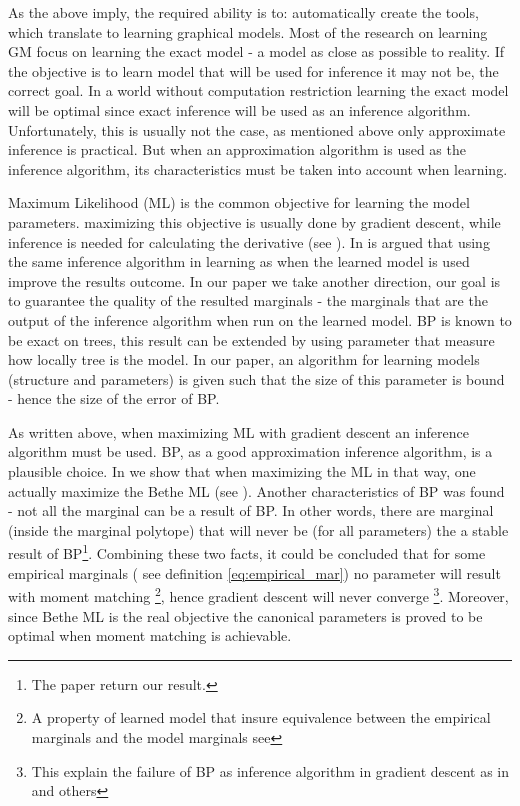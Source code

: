 As the above imply, the required ability is to: automatically create the tools, which translate to learning graphical models.
Most of the research on learning GM focus on learning the exact model - a model as close as possible to reality.
If the objective is to learn model that will be used for inference it may not be, the correct goal.
In a world without computation restriction learning the exact model will be optimal since exact inference will be used as an inference algorithm.
Unfortunately, this is usually not the case, as mentioned above only approximate inference is practical.
But when an approximation algorithm is used as the inference algorithm, its characteristics must be taken into account when learning.

Maximum Likelihood (ML) is the common objective for learning the model parameters.
maximizing this objective is usually done by gradient descent, while inference is needed for calculating the derivative (see ).
In \cite{wainwright2006estimating} is argued that using the same inference algorithm in learning as when the learned model is used improve the results outcome.
In our paper \cite{heinemann2014inferning} we take another direction, our goal is to guarantee the quality of the resulted marginals - the marginals that are the output of the inference algorithm when run on the learned model.
BP is known to be exact on trees, this result can be extended by using parameter that measure how locally tree is the model.
In our paper, an algorithm for learning models (structure and parameters) is given such that the size of this parameter is bound - hence the size of the error of BP.

As written above, when maximizing ML with gradient descent an inference algorithm must be used.
BP, as a good approximation inference algorithm, is a plausible choice.
In \cite{heinemann2012cannot} we show that when maximizing the ML in that way, one actually maximize the Bethe ML (see ).
Another characteristics of BP was found - not all the marginal can be a result of BP.
In other words, there are marginal (inside the marginal polytope) that will never be (for all parameters) the a stable result of BP\footnote{ The paper \cite{pitkow2011learning} return our result.}.
Combining these two facts, it could be concluded that for some empirical marginals ( see definition \eqref{eq:empirical_mar}) no parameter will result with moment matching \footnote{ A property of learned model that insure equivalence between the empirical marginals and the model marginals see }, hence gradient descent will never converge \footnote{This explain the failure of BP as inference algorithm in gradient descent as in \cite{wainwright2006estimating} and others}.
Moreover, since Bethe ML is the real objective the canonical parameters is proved to be optimal when moment matching is achievable.

